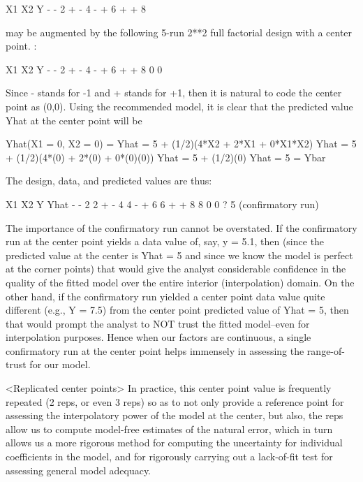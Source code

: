         X1     X2      Y
         -      -      2
         +      -      4
         -      +      6
         +      +      8

may be augmented by the following 5-run 2**2 full
factorial design with a center point.  :

        X1     X2      Y
         -      -      2
         +      -      4
         -      +      6
         +      +      8
         0      0

Since - stands for -1 and + stands for +1, then it
is natural to code the center point as (0,0).
Using the recommended model, it is clear that the
predicted value Yhat at the center point will be

   Yhat(X1 = 0, X2 = 0) =
   Yhat = 5 + (1/2)(4*X2 + 2*X1 + 0*X1*X2)
   Yhat = 5 + (1/2)(4*(0) + 2*(0) + 0*(0)(0))
   Yhat = 5 + (1/2)(0)
   Yhat = 5 = Ybar

The design, data, and predicted values are thus:

        X1     X2      Y     Yhat
         -      -      2       2
         +      -      4       4
         -      +      6       6
         +      +      8       8
         0      0      ?       5  (confirmatory run)

The importance of the confirmatory run cannot be
overstated.  If the confirmatory run at the center
point yields a data value of, say, y = 5.1, then
(since the predicted value at the center is Yhat =
5 and since we know the model is perfect at the
corner points) that would give the analyst
considerable confidence in the quality of the
fitted model over the entire interior
(interpolation) domain.  On the other hand, if the
confirmatory run yielded a center point data value
quite different (e.g., Y = 7.5) from the center
point predicted value of Yhat = 5, then that would
prompt the analyst to NOT trust the fitted
model--even for interpolation purposes.  Hence
when our factors are continuous, a single
confirmatory run at the center point helps
immensely in assessing the range-of-trust for our
model.

<Replicated center points>
In practice, this center point value is frequently
repeated (2 reps, or even 3 reps) so as to not
only provide a reference point for assessing the
interpolatory power of the model at the center,
but also, the reps allow us to compute model-free
estimates of the natural error, which in turn
allows us a more rigorous method for computing the
uncertainty for individual coefficients in the
model, and for rigorously carrying out a
lack-of-fit test for assessing general model
adequacy.

